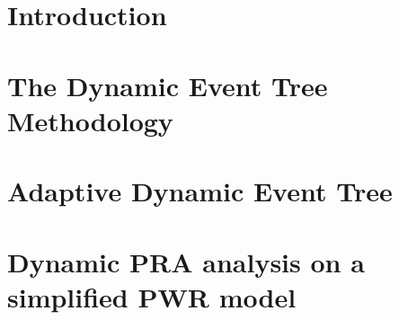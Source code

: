 \documentclass[pdf,ps2pdf,12pt]{INLreport}
\begin{document}
%    




    \SANDmain		%

    \section{Introduction}
    

    \section{The Dynamic Event Tree Methodology}
   

    \section{Adaptive Dynamic Event Tree}
   

    \section{Dynamic PRA analysis on a simplified PWR model}
    
\end{document}
